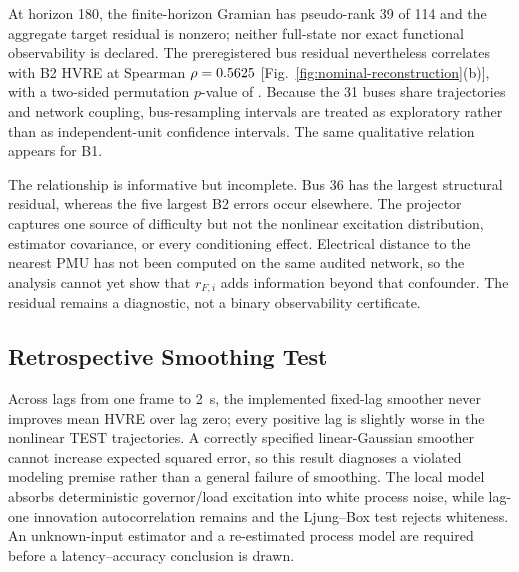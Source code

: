 At horizon 180, the finite-horizon Gramian has pseudo-rank 39 of 114 and the aggregate target residual is nonzero; neither full-state nor exact functional observability is declared. The preregistered bus residual nevertheless correlates with B2 HVRE at Spearman $\rho=0.5625$ [Fig.~\ref{fig:nominal-reconstruction}(b)], with a two-sided permutation $p$-value of \FunctionalPermutationP{}. Because the 31 buses share trajectories and network coupling, bus-resampling intervals are treated as exploratory rather than as independent-unit confidence intervals. The same qualitative relation appears for B1.

The relationship is informative but incomplete. Bus 36 has the largest structural residual, whereas the five largest B2 errors occur elsewhere. The projector captures one source of difficulty but not the nonlinear excitation distribution, estimator covariance, or every conditioning effect. Electrical distance to the nearest PMU has not been computed on the same audited network, so the analysis cannot yet show that $r_{F,i}$ adds information beyond that confounder. The residual remains a diagnostic, not a binary observability certificate.

\subsection{Retrospective Smoothing Test}

Across lags from one frame to 2~s, the implemented fixed-lag smoother never improves mean HVRE over lag zero; every positive lag is slightly worse in the nonlinear TEST trajectories. A correctly specified linear-Gaussian smoother cannot increase expected squared error, so this result diagnoses a violated modeling premise rather than a general failure of smoothing. The local model absorbs deterministic governor/load excitation into white process noise, while lag-one innovation autocorrelation remains \OriginalInnovationACF{} and the Ljung--Box test rejects whiteness. An unknown-input estimator \cite{gillijns2007input} and a re-estimated process model are required before a latency--accuracy conclusion is drawn.
